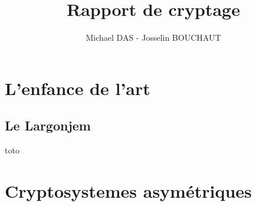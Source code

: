\documentclass{report}
\title{Rapport de cryptage}
\author{Michael DAS - Josselin BOUCHAUT}
\begin{document}
\maketitle
\tableofcontents

\section{L'enfance de l'art}

\subsection{Le Largonjem}
toto

\section{Cryptosystemes asymétriques}

\end{document}
